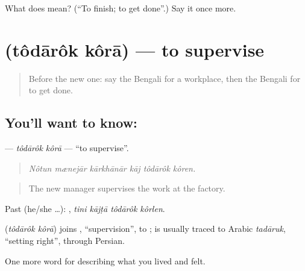 \begin{tcolorbox}[breakable,colback=teal!4,colframe=teal!35!black,title={Before you move on}]
What does  mean? (\textquotedblleft{}To finish; to get done\textquotedblright{}.) Say it once more.
\end{tcolorbox}
\section[\texorpdfstring{\bn{তদারক} \bn{করা} (tôdārôk kôrā)}{তদারক করা (tôdārôk kôrā)}]{  (tôdārôk kôrā) — to supervise}

\label{lesson:BN-C500-todarok-kora}



\begin{quote}
Before the new one: say the Bengali for a workplace, then the Bengali for to get done.
\end{quote}

\subsection*{You'll want to know:  }
\textbf{ } — \emph{tôdārôk kôrā} — \textquotedblleft{}to supervise\textquotedblright{}.

\begin{quote}
     
\end{quote}

\begin{quote}
\emph{Nôtun mænejār kārkhānār kāj tôdārôk kôren.}
\end{quote}

\begin{quote}
The new manager supervises the work at the factory.
\end{quote}

Past (he/she …):    , \emph{tini kājṭā tôdārôk kôrlen}.

\begin{cousinweb}
\textbf{ } (\emph{tôdārôk kôrā}) joins , \textquotedblleft{}supervision\textquotedblright{}, to ;  is usually traced to Arabic \emph{tadāruk}, \textquotedblleft{}setting right\textquotedblright{}, through Persian.
\end{cousinweb}

\begin{grammarlens}[title={What you've built}]
One more word for describing what you lived and felt.
\end{grammarlens}


